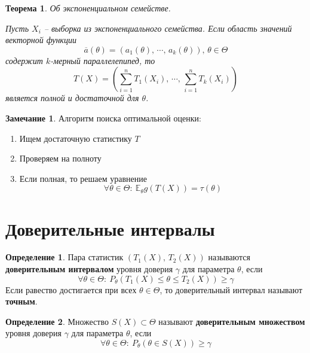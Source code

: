 \documentclass[a4paper,12pt]{article}
\renewcommand{\leq}{\ensuremath{\leqslant}}
\renewcommand{\geq}{\ensuremath{\geqslant}}
\theoremstyle{plain}
\newtheorem{theorem}{Теорема}[section]
\theoremstyle{definition}
\newtheorem{definition}{Определение}[section]
\newtheorem*{note}{Замечание}
\theoremstyle{remark}
\begin{document}
\begin{theorem}
  Об экспоненциальном семействе.

  Пусть $X_i$ -- выборка из экспоненциального семейства. Если область значений векторной функции 
  \[
    \overline{a}(\theta) = (a_1(\theta),\,\cdots,\,a_k(\theta)),\, \theta \in \Theta
  \]
  содержит $k$-мерный параллелепипед, то
  \[
    T(X) = (\sum_{i = 1}^nT_1(X_i),\,\cdots,\,\sum_{i = 1}^nT_k(X_i))
  \]
  является полной и достаточной для $\theta$.
\end{theorem}

\begin{note}
  Алгоритм поиска оптимальной оценки:
  \begin{enumerate}
    \item Ищем достаточную статистику $T$
    \item Проверяем на полноту
    \item Если полная, то решаем уравнение 
    \[
      \forall \theta \in \Theta :\: \mathbb{E}_\theta g(T(X)) = \tau(\theta)
    \]
  \end{enumerate}
\end{note}

\section{Доверительные интервалы}
\begin{definition}
    Пара статистик $(T_1(X),\,T_2(X))$ называются \textbf{доверительным интервалом} уровня доверия $\gamma$ для параметра $\theta$, если 
    \[
      \forall \theta \in \Theta :\: P_\theta(T_1(X) \leq \theta \leq T_2(X)) \geq \gamma
    \]
    Если равество достигается при всех $\theta \in \Theta$, то доверительный интервал называют \textbf{точным}.
\end{definition}

\begin{definition}
  Множество $S(X) \subset \Theta$ называют \textbf{доверительным множеством} уровня доверия $\gamma$ для параметра $\theta$, если
  \[
    \forall \theta \in \Theta :\: P_\theta(\theta \in S(X)) \geq \gamma
  \]
\end{definition}
\end{document}
